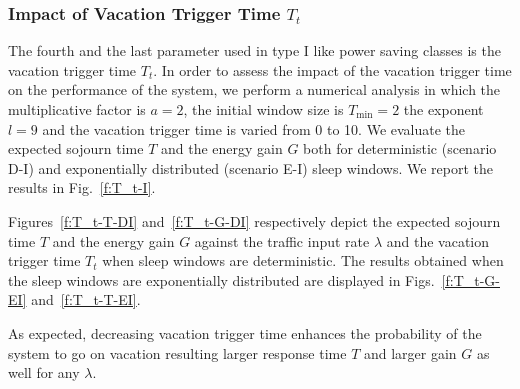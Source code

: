 \documentclass[journal]{IEEEtran}
\begin{document}
\subsubsection{Impact of Vacation Trigger Time $T_t$}
\label{s:T_t}
The fourth and the last parameter used in type I like power saving classes
is the vacation trigger time $T_t$. In order to assess the impact of the vacation trigger time on the performance of the system, we perform a numerical analysis in which the multiplicative factor is $a=2$, the initial window size is $T_{\min}=2$ the exponent $l=9$ and the vacation trigger time is varied from 0 to 10. We evaluate the expected sojourn time $T$ and the energy gain $G$ both for deterministic (scenario D-I) and exponentially distributed (scenario E-I) sleep windows. We report the results in Fig.~\ref{f:T_t-I}.
\begin{figure*}[tb]
\begin{center}
\caption{Impact of $T_t$ on $T$ and $G$ with either deterministic or exponential $\{S_i\}_i$.
\label{f:T_t-I}}
\end{center}
\end{figure*}
Figures~\ref{f:T_t-T-DI} and~\ref{f:T_t-G-DI} respectively depict the expected sojourn time $T$ and the energy gain $G$ against the traffic input rate $\lambda$ and the vacation trigger time $T_t$ when sleep windows are deterministic. The results obtained when the sleep windows are exponentially distributed are displayed in Figs.~\ref{f:T_t-G-EI} and~\ref{f:T_t-T-EI}.

As expected, decreasing vacation trigger time enhances the probability of the system to go on vacation resulting larger response time $T$ and larger gain $G$ as well for any $\lambda$.
\end{document}

